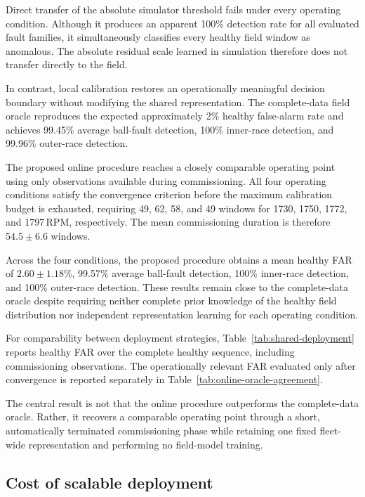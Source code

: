 \documentclass{trbunofficial}
\begin{document}
Direct transfer of the absolute simulator threshold fails under every
operating condition. Although it produces an apparent 100\% detection rate
for all evaluated fault families, it simultaneously classifies every healthy
field window as anomalous. The absolute residual scale learned in simulation
therefore does not transfer directly to the field.

In contrast, local calibration restores an operationally meaningful decision
boundary without modifying the shared representation. The complete-data
field oracle reproduces the expected approximately 2\% healthy false-alarm
rate and achieves 99.45\% average ball-fault detection, 100\% inner-race
detection, and 99.96\% outer-race detection.

The proposed online procedure reaches a closely comparable operating point
using only observations available during commissioning. All four operating
conditions satisfy the convergence criterion before the maximum calibration
budget is exhausted, requiring 49, 62, 58, and 49 windows for 1730, 1750,
1772, and 1797\,RPM, respectively. The mean commissioning duration is
therefore $54.5 \pm 6.6$ windows.

Across the four conditions, the proposed procedure obtains a mean healthy FAR
of $2.60 \pm 1.18$\%, 99.57\% average ball-fault detection, 100\%
inner-race detection, and 100\% outer-race detection. These results remain
close to the complete-data oracle despite requiring neither complete prior
knowledge of the healthy field distribution nor independent representation
learning for each operating condition.

For comparability between deployment strategies,
Table~\ref{tab:shared-deployment} reports healthy FAR over the complete
healthy sequence, including commissioning observations. The operationally
relevant FAR evaluated only after convergence is reported separately in
Table~\ref{tab:online-oracle-agreement}.

The central result is not that the online procedure outperforms the
complete-data oracle. Rather, it recovers a comparable operating point
through a short, automatically terminated commissioning phase while retaining
one fixed fleet-wide representation and performing no field-model training.

\subsection{Cost of scalable deployment}
\label{sec:deployment-cost}
\end{document}
